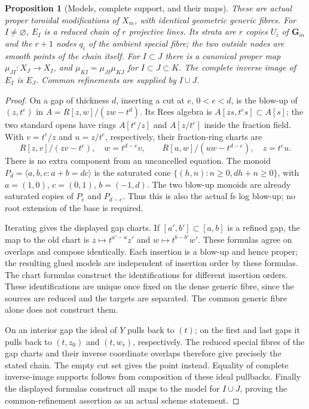 \documentclass[11pt]{article}
\newtheorem{proposition}[theorem]{Proposition}
\theoremstyle{definition}
\theoremstyle{remark}
\begin{document}
\begin{proposition}[Models, complete support, and their maps]
\label{prop:cut-models}
These are actual proper toroidal modifications of $X_m$, with identical
geometric generic fibres.  For $I\ne\varnothing$, $E_I$ is a reduced
chain of $r$ projective lines.  Its strata are $r$ copies $U_i$ of
$\mathbf G_m$ and the $r+1$ nodes $q_i$ of the ambient special fibre;
the two outside nodes are smooth points of the chain itself.
For $I\subset J$ there is a canonical proper map
$\mu_{JI}:X_J\to X_I$, and
$\mu_{KI}=\mu_{JI}\mu_{KJ}$ for $I\subset J\subset K$.
The complete inverse image of $E_I$ is $E_J$.
Common refinements are supplied by $I\cup J$.
\end{proposition}
\begin{proof}
On a gap of thickness $d$, inserting a cut at $e$, $0<e<d$, is the
blow-up of $(z,t^e)$ in $A=R[z,w]/(zw-t^d)$.  Its Rees algebra
is $A[zs,t^es]\subset A[s]$; the two standard opens have rings
$A[t^e/z]$ and $A[z/t^e]$ inside the fraction field.  With
$v=t^e/z$ and $u=z/t^e$, respectively, their fraction-ring charts are
\[
 R[z,v]/(zv-t^e),\quad w=t^{d-e}v,
 \qquad R[u,w]/(uw-t^{d-e}),\quad z=t^eu.
\]
There is no extra component from an uncancelled equation.  The monoid
$P_d=\langle a,b,c:a+b=dc\rangle$ is the saturated cone
$\{(h,n):n\geq0,dh+n\geq0\}$, with $a=(1,0)$, $c=(0,1)$,
$b=(-1,d)$.  The two blow-up monoids are already saturated copies
of $P_e$ and $P_{d-e}$.  Thus this is also the actual fs log blow-up;
no root extension of the base is required.

Iterating gives the displayed gap charts.  If $[a',b']\subset[a,b]$
is a refined gap, the map to the old chart is
$z\mapsto t^{a'-a}z'$ and $w\mapsto t^{b-b'}w'$.
These formulas agree on overlaps and compose identically.  Each
insertion is a blow-up and hence proper; the resulting glued models
are independent of insertion order by these formulas.  The chart formulas construct the identifications for different
insertion orders.  These identifications are unique once fixed on the
dense generic fibre, since the sources are reduced and the targets
are separated.  The common generic fibre alone does not construct them.

On an interior gap the ideal of $Y$ pulls back to $(t)$; on the first
and last gaps it pulls back to $(t,z_0)$ and $(t,w_r)$, respectively.
The reduced special fibres of the gap charts and their inverse
coordinate overlaps therefore give precisely the stated chain.
The empty cut set gives the point instead.  Equality of complete
inverse-image supports follows from composition of these ideal
pullbacks.  Finally the displayed formulas construct all maps to the
model for $I\cup J$, proving the common-refinement assertion as an
actual scheme statement.
\end{proof}
\end{document}

